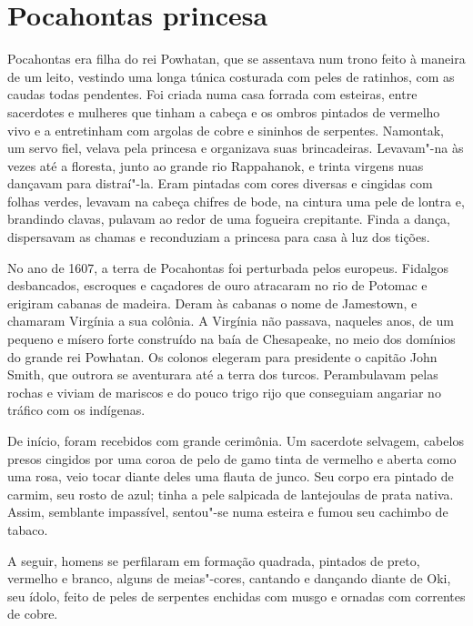 \chapter{Pocahontas princesa}

Pocahontas era filha do rei Powhatan, que se assentava num trono feito à
maneira de um leito, vestindo uma longa túnica costurada com peles de
ratinhos, com as caudas todas pendentes. Foi criada numa casa forrada com
esteiras, entre sacerdotes e mulheres que tinham a cabeça e os ombros
pintados de vermelho vivo e a entretinham com argolas de cobre e sininhos
de serpentes. Namontak, um servo fiel, velava pela princesa e organizava
suas brincadeiras. Levavam"-na às vezes até a floresta, junto ao grande rio
Rappahanok, e trinta virgens nuas dançavam para distraí"-la. Eram pintadas
com cores diversas e cingidas com folhas verdes, levavam na cabeça chifres
de bode, na cintura uma pele de lontra e, brandindo clavas, pulavam ao
redor de uma fogueira crepitante. Finda a dança, dispersavam as chamas e
reconduziam a princesa para casa à luz dos tições.

No ano de 1607, a terra de Pocahontas foi perturbada pelos europeus.
Fidalgos desbancados, escroques e caçadores de ouro atracaram no rio de
Potomac e erigiram cabanas de madeira. Deram às cabanas o nome de
Jamestown, e chamaram Virgínia a sua colônia. A Virgínia não passava,
naqueles anos, de um pequeno e mísero forte construído na baía de
Chesapeake, no meio dos domínios do grande rei Powhatan. Os colonos
elegeram para presidente o capitão John Smith, que outrora se aventurara
até a terra dos turcos. Perambulavam pelas rochas e viviam de mariscos e
do pouco trigo rijo que conseguiam angariar no tráfico com os indígenas.

De início, foram recebidos com grande cerimônia. Um sacerdote selvagem,
cabelos presos cingidos por uma coroa de pelo de gamo tinta de vermelho e
aberta como uma rosa, veio tocar diante deles uma flauta de junco. Seu
corpo era pintado de carmim, seu rosto de azul; tinha a pele salpicada de
lantejoulas de prata nativa. Assim, semblante impassível, sentou"-se numa
esteira e fumou seu cachimbo de tabaco.

A seguir, homens se perfilaram em formação quadrada, pintados de preto,
vermelho e branco, alguns de meias"-cores, cantando e dançando diante de
Oki, seu ídolo, feito de peles de serpentes enchidas com musgo e ornadas
com correntes de cobre.

